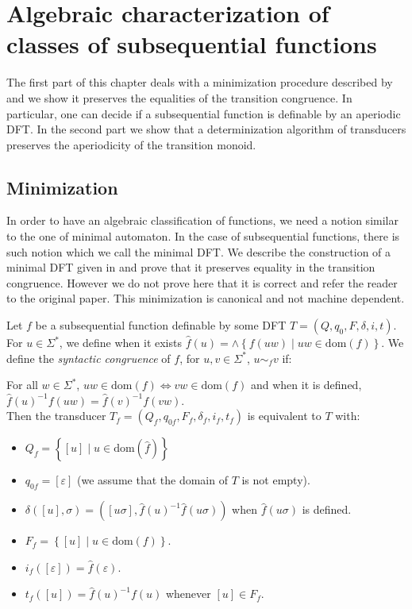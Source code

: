 \documentclass[12pt]{report}
\theoremstyle{definition}
\theoremstyle{remark}
\begin{document}
\chapter{Algebraic characterization of classes of subsequential functions}
\label{chap4}

The first part of this chapter deals with a minimization procedure described by \cite{choffrut03} and we show it preserves the equalities of the transition congruence.
In particular, one can decide if a subsequential function is definable by an aperiodic DFT.
In the second part we show that a determinization algorithm of transducers preserves the aperiodicity of the transition monoid.

\section{Minimization}
\label{mindft}
In order to have an algebraic classification of functions, we need a notion similar to the one of minimal automaton. In the case of subsequential functions, there is such notion which we call the minimal DFT.
We describe the construction of a minimal DFT given in \cite{choffrut03} and prove that it preserves equality in the transition congruence.
However we do not prove here that it is correct and refer the reader to the original paper.
This minimization is canonical and not machine dependent.

Let $f$ be a subsequential function definable by some DFT $T =(Q,q_0,F,\delta,i,t)$.
For $u\in \Sigma^\ast$, we define when it exists $\widehat f(u)=\wedge\left\{f(uw)\mid  uw\in \mathrm{dom}(f) \right\}$.
We define the \emph{syntactic congruence} of $f$, for $u,v\in \Sigma^\ast$, $u\sim_f v$ if:

For all $w\in \Sigma^\ast$, $uw\in \mathrm{dom}(f) \Leftrightarrow vw\in \mathrm{dom}(f)$ and when it is defined, $\widehat f(u)^{-1} f(uw) = \widehat f(v)^{-1}f(vw)$.\\
Then the transducer $T_f=(Q_f,q_{0f},F_f,\delta_f,i_f,t_f)$ is equivalent to $T$ with:
\begin{itemize}
\item $Q_f=\left\{ [u]\mid  u\in \mathrm{dom}(\widehat f)\right\}$
\item $q_{0f}=[\varepsilon]$ (we assume that the domain of $T$ is not empty).
\item $\delta([u],\sigma)=([u\sigma],\widehat f(u)^{-1}\widehat f(u\sigma))$ when $\widehat f(u\sigma)$ is defined.
\item $F_f=\left\{[u]\mid  u\in \mathrm{dom}(f) \right\}$.
\item $i_f([\varepsilon])=\widehat f(\varepsilon)$.
\item $t_f([u])=\widehat f(u)^{-1}f(u)$ whenever $[u]\in F_f$.
\end{itemize}
\end{document}
